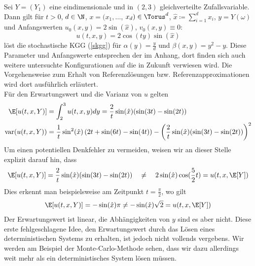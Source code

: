\begin{mathbsp}
\label{bsp:trial1}
Sei $Y=(Y_1)$ eine eindimensionale und in $(2,3)$ gleichverteilte Zufallsvariable. Dann gilt für $t>0$, $d\in\N$, $x=(x_1,\dots$, $x_d)\in\Torus^d$, $\hat{x}\coloneqq \sum_{i=1}^d x_i$, $y=Y(\omega)$ und Anfangswerten $u_0(x,y)=2\sin(\hat{x})$, $v_0(x,y)\equiv 0$:
\begin{equation*}
u(t,x,y)=2\cos(ty)\sin(\hat{x})
\end{equation*}
löst die stochastische KGG (\ref{skgg}) für $\alpha(y)=\frac{y}{d}$ und $\beta(x,y)=y^2-y$. Diese Parameter und Anfangswerte entsprechen der  im Anhang, dort finden sich auch weitere untersuchte Konfigurationen auf die in Zukunft verwiesen wird. Die Vorgehensweise zum Erhalt von Referenzlösungen bzw. Referenzapproximationen wird dort ausführlich erläutert.\\
Für den Erwartungswert und die Varianz von $u$ gelten
\begin{align*}
\E[u(t,x,Y)]&=\int_2^3u(t,x,y)dy=\frac{2}{t}\sin(\hat{x})(\sin(3t) - \sin(2t))\\
\text{var}(u(t,x,Y))&=\frac{1}{t}\sin^2(\hat{x})\left(2t + \sin(6t) - \sin(4t)\right)- \left(\frac{2}{t}\sin(\hat{x})(\sin(3t) - \sin(2t))\right)^2
\end{align*}
Um einen potentiellen Denkfehler zu vermeiden, weisen wir an dieser Stelle explizit darauf hin, dass 
\[\E[u(t,x,Y)]=\frac{2}{t}\sin(\hat{x})(\sin(3t) - \sin(2t))\quad \neq \quad 2\sin(\hat{x})\cos(\frac{5}{2}t)=u(t,x,\E[Y])\]
Dies erkennt man beispielsweise am Zeitpunkt $t=\frac{\pi}{2}$, wo gilt
\[\E[u(t,x,Y)]=-\sin(\hat{x})\pi \neq -\sin(\hat{x})\sqrt{2}=u(t,x,\E[Y])\]
Der Erwartungswert ist linear, die Abhängigkeiten von $y$ sind es aber nicht. Diese erste fehlgeschlagene Idee, den Erwartungswert durch das Lösen eines deterministischen Systems zu erhalten, ist jedoch nicht vollends vergebens. Wir werden am Beispiel der Monte-Carlo-Methode sehen, dass wir dazu allerdings weit mehr als ein deterministisches System lösen müssen.
\end{mathbsp}

